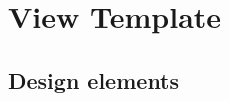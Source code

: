 \chapter{View Template} \label{chp:view-template}
	\begin{comment}
		An SDD shall be organized into one or more design views.
		
		Each design view in an SDD shall conform to its governing design viewpoint.
		The purpose of a design view is to address design concerns pertaining to the design subject, to allow a
		design stakeholder to focus on design details from a specific perspective and effectively address relevant
		requirements.
		
		Each design view shall address the design concerns specified by its governing design viewpoint.
		
		An SDD is complete when each identified design concern is the topic of at least one design view; all design
		attributes refined from each design concern by some viewpoint have been specified for all of the design
		entities and relationships in its associated view; and all design constraints have been applied.
		
		An SDD is consistent if there are no known conflicts between the design elements of its design views.
		
		NOTE—Users of this standard may wish to state delivery requirements on an SDD in terms of the above notions of
		completeness and consistency.
	\end{comment}
	
		
	\section{Design elements} \label{s:view-template:design-elements}
		\begin{comment}
			A design element is any item occurring in a design view. A design element may be any of the following
			subcases: design entity, design relationship, design attribute, or design constraint.
			
			Each design element in the SDD shall have a name (4.6.2.1), a type (4.6.2.2), and any contents.
			
			NOTE 1—This requirement is “inherited” by the four subcases: design entities, design relationships, design attributes,
			and design constraints.
			
			The type of each design element shall be introduced within exactly one design viewpoint definition.
			
			A design element may be used in one or more design views.
			
			NOTE 2—A design element is introduced and “owned” by exactly one design view, in accordance with its type
			definition within the associated viewpoint. It may be shared or referenced within other design views. Sharing of design
			elements permits the expression of design aspects as in aspect-oriented design.
		\end{comment}
		
